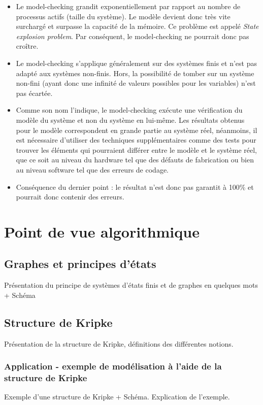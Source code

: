 \documentclass[runningheads,a4paper,11pt]{llncs}
\begin{document}
\begin{itemize}
\item Le model-checking grandit exponentiellement par rapport au nombre de processus actifs (taille du système). Le modèle devient donc très vite surchargé et surpasse la capacité de la mémoire. Ce problème est appelé \textit{State explosion problem}. Par conséquent, le model-checking ne pourrait donc pas croître. 
\item Le model-checking s'applique généralement sur des systèmes finis et n'est pas adapté aux systèmes non-finis. Hors, la possibilité de tomber sur un système non-fini (ayant donc une infinité de valeurs possibles pour les variables) n'est pas écartée. 
\item Comme son nom l'indique, le model-checking exécute une vérification du modèle du système et non du système en lui-même. Les résultats obtenus pour le modèle correspondent en grande partie au système réel, néanmoins, il est nécessaire d'utiliser des techniques supplémentaires comme des tests pour trouver les éléments qui pourraient différer entre le modèle et le système réel, que ce soit au niveau du hardware tel que des défauts de fabrication ou bien au niveau software tel que des erreurs de codage. 
\item Conséquence du dernier point : le résultat n'est donc pas garantit à 100\% et pourrait donc contenir des erreurs. 
\end{itemize}

\section{Point de vue algorithmique}

\subsection{Graphes et principes d'états}
Présentation du principe de systèmes d'états finis et de graphes en quelques mots + Schéma 

\subsection{Structure de Kripke}
Présentation de la structure de Kripke, définitions des différentes notions. 

\subsubsection{Application - exemple de modélisation à l'aide de la structure de Kripke}
Exemple d'une structure de Kripke + Schéma. Explication de l'exemple. 
\end{document}
